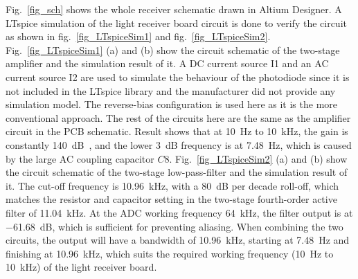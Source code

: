 Fig.~\ref{fig_sch} shows the whole receiver schematic drawn in Altium Designer.  A LTspice simulation of the light receiver board circuit is done to verify the circuit as shown in fig.~\ref{fig_LTspiceSim1} and fig.~\ref{fig_LTspiceSim2}.  Fig.~\ref{fig_LTspiceSim1} (a) and (b) show the circuit schematic of the two-stage amplifier and the simulation result of it.  A DC current source I1 and an AC current source I2 are used to simulate the behaviour of the photodiode since it is not included in the LTspice library and the manufacturer did not provide any simulation model.  The reverse-bias configuration is used here as it is the more conventional approach.  The rest of the circuits here are the same as the amplifier circuit in the PCB schematic.  Result shows that at \qty{10}{Hz} to \qty{10}{kHz}, the gain is constantly \qty{140}{dB\Omega}, and the lower \qty{3}{dB} frequency is at \qty{7.48}{Hz}, which is caused by the large AC coupling capacitor $C8$.  Fig.~\ref{fig_LTspiceSim2} (a) and (b) show the circuit schematic of the two-stage low-pass-filter and the simulation result of it.  The cut-off frequency is \qty{10.96}{kHz}, with a \qty{80}{dB} per decade roll-off, which matches the resistor and capacitor setting in the two-stage fourth-order active filter of \qty{11.04}{kHz}.  At the ADC working frequency \qty{64}{kHz}, the filter output is at \qty{-61.68}{dB}, which is sufficient for preventing aliasing.  When combining the two circuits, the output will have a bandwidth of \qty{10.96}{kHz}, starting at \qty{7.48}{Hz} and finishing at \qty{10.96}{kHz}, which suits the required working frequency (\qty{10}{Hz} to \qty{10}{kHz}) of the light receiver board.

